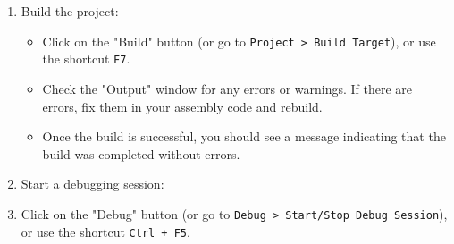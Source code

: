 \begin{enumerate}[nosep]
    \item Build the project:
    \begin{itemize}[nosep]
        \item Click on the "Build" button (or go to \texttt{Project > Build Target}), or use the shortcut \texttt{F7}.
        \item Check the "Output" window for any errors or warnings. If there are errors, fix them in your assembly code and rebuild.
        \item Once the build is successful, you should see a message indicating that the build was completed without errors.
    \end{itemize}
    \item Start a debugging session:
    \item Click on the "Debug" button (or go to \texttt{Debug > Start/Stop Debug Session}), or use the shortcut \texttt{Ctrl + F5}.
\end{enumerate}
\clearpage
